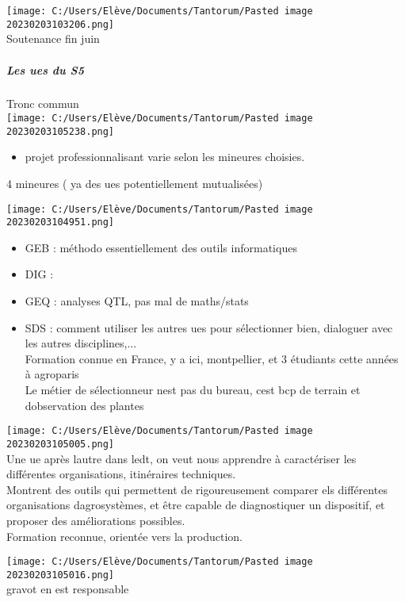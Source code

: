 \documentclass[
]{article}
\providecommand{\tightlist}{%
  \setlength{\itemsep}{0pt}\setlength{\parskip}{0pt}}
\begin{document}
\texttt{[image: C:/Users/Elève/Documents/Tantorum/Pasted image 20230203103206.png]}\\
Soutenance fin juin

\hypertarget{les-ues-du-s5}{%
\subparagraph{Les ues du S5}\label{les-ues-du-s5}}

Tronc commun\\
\texttt{[image: C:/Users/Elève/Documents/Tantorum/Pasted image 20230203105238.png]}

\begin{itemize}
\tightlist
\item
  projet professionnalisant varie selon les mineures choisies.
\end{itemize}

4 mineures ( ya des ues potentiellement mutualisées)

\texttt{[image: C:/Users/Elève/Documents/Tantorum/Pasted image 20230203104951.png]}

\begin{itemize}
\tightlist
\item
  GEB : méthodo essentiellement des outils informatiques
\item
  DIG :
\item
  GEQ : analyses QTL, pas mal de maths/stats
\item
  SDS : comment utiliser les autres ues pour sélectionner bien,
  dialoguer avec les autres disciplines,...\\
  Formation connue en France, y a ici, montpellier, et 3 étudiants cette
  années à agroparis\\
  Le métier de sélectionneur n\textquotesingle est pas du bureau,
  c\textquotesingle est bcp de terrain et d\textquotesingle observation
  des plantes
\end{itemize}

\texttt{[image: C:/Users/Elève/Documents/Tantorum/Pasted image 20230203105005.png]}\\
Une ue après l\textquotesingle autre dans l\textquotesingle edt, on veut
nous apprendre à caractériser les différentes organisations, itinéraires
techniques.\\
Montrent des outils qui permettent de rigoureusement comparer els
différentes organisations d\textquotesingle agrosystèmes, et être
capable de diagnostiquer un dispositif, et proposer des améliorations
possibles.\\
Formation reconnue, orientée vers la production.

\texttt{[image: C:/Users/Elève/Documents/Tantorum/Pasted image 20230203105016.png]}\\
gravot en est responsable
\end{document}
